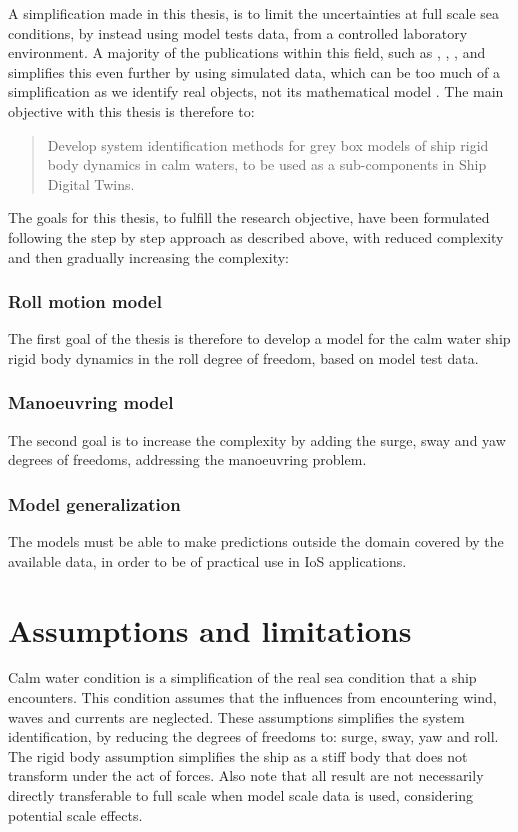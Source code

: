 \noindent A simplification made in this thesis, is to limit the uncertainties at full scale sea conditions, by instead using model tests data, from a controlled laboratory environment. A majority of the publications within this field, such as \cite{shi_identification_2009}, \cite{perera_system_2015}, \cite{zhu_parameter_2017}, \cite{wang_parameter_2021} and \cite{xue_hydrodynamic_2020} simplifies this even further by using simulated data, which can be too much of a simplification as we identify real objects, not its mathematical model \cite{miller_ship_2021}.
The main objective with this thesis is therefore to:
\begin{quote} 
Develop system identification methods for grey box models of ship rigid body dynamics in calm waters, to be used as a sub-components in Ship Digital Twins. 
\end{quote}

\noindent 
The goals for this thesis, to fulfill the research objective, have been formulated following the step by step approach as described above, with reduced complexity and then gradually increasing the complexity:

\subsubsection*{Roll motion model}
The first goal of the thesis is therefore to develop a model for the calm water ship rigid body dynamics in the roll degree of freedom, based on model test data.

\subsubsection*{Manoeuvring model}
The second goal is to increase the complexity by adding the surge, sway and yaw degrees of freedoms, addressing the manoeuvring problem.

\subsubsection*{Model generalization}
The models must be able to make predictions outside the domain covered by the available data, in order to be of practical use in IoS applications.

\section{Assumptions and limitations}
Calm water condition is a simplification of the real sea condition that a ship encounters. This condition assumes that the influences from encountering wind, waves and currents are neglected. These assumptions simplifies the system identification, by reducing the degrees of freedoms to: surge, sway, yaw and roll. 
The rigid body assumption simplifies the ship as a stiff body that does not transform under the act of forces. 
Also note that all result are not necessarily directly transferable to full scale when model scale data is used, considering potential scale effects. 

